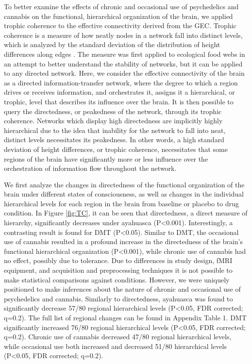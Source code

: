 To better examine the effects of chronic and occasional use of
psychedelics and cannabis on the functional, hierarchical organization
of the brain, we applied trophic coherence to the effective connectivity
derived from the GEC. Trophic coherence is a measure of how neatly nodes
in a network fall into distinct levels, which is analyzed by the
standard deviation of the distribution of height differences along edges \parencite{Johnson2014,MacKay2020}. The measure was first
applied to ecological food webs in an attempt to better understand the
stability of networks, but it can be applied to any directed network.
Here, we consider the effective connectivity of the brain as a directed
information-transfer network, where the degree to which a region drives
or receives information, and orchestrates it, assigns it a hierarchical,
or trophic, level that describes its influence over the brain. It is
then possible to query the directedness, or peakedness of the network,
through its trophic coherence. Networks which display high directedness
are implicitly highly hierarchical due to the idea that inability for
the network to fall into neat, distinct levels necessitates its
peakedness. In other words, a high standard deviation of height
differences, or trophic coherence, necessitates that some regions of the
brain have significantly more or less influence over the orchestration
of information flow throughout the network.

We first analyze the changes in directedness of the functional
organization of the brain under different states of consciousness, as
well as changes in the individual hierarchical levels for each region in
the brain from baseline or placebo to drug condition. In Figure \ref{fig:TC}, it
can be seen that directedness, a direct measure of hierarchy,
significantly decreases under ayahuasca (P\textless0.001).
Interestingly, a contrasting result is found for DMT (P\textless0.05).
Similar to DMT, the occasional use of cannabis resulted in a profound
increase in the directedness of the brain's functional hierarchical
organization (P\textless0.001), while chronic use of cannabis had no
effect, possibly due to tolerance. Due to differences in study design,
fMRI equipment, and acquisition and preprocessing techniques it is not
possible to make statistical comparisons against conditions. However, we
were uniquely positioned to make inferences about the nature of chronic
and occasional use of psychedelics and cannabis. Similarly to
directedness, ayahuasca was found to significantly decrease 57/80
regional hierarchical levels (P\textless0.05, FDR corrected; q=0.2). The
full list of regional changes can be found in Appendix Table 1. DMT
significantly increased 76/80 regional hierarchical levels
(P\textless0.05, FDR corrected; q=0.2). Chronic use of cannabis
decreased 47/80 regional hierarchical levels, while occasional use both
increased and decreased 51/80 hierarchical levels (P\textless0.05, FDR
corrected; q=0.2).

